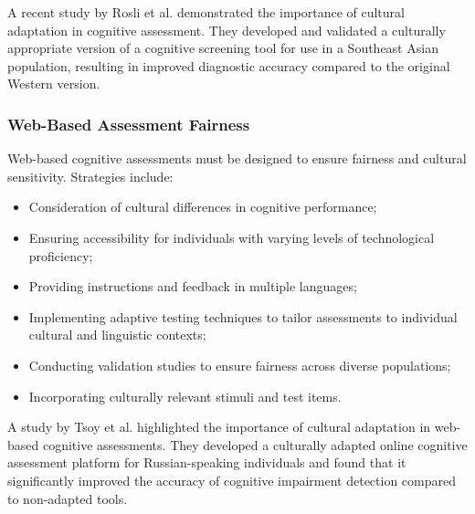 A recent study by Rosli et al. \cite{Rosli2021} demonstrated the importance of cultural adaptation in cognitive assessment. They developed and validated a culturally appropriate version of a cognitive screening tool for use in a Southeast Asian population, resulting in improved diagnostic accuracy compared to the original Western version.

\subsubsection{Web-Based Assessment Fairness}
Web-based cognitive assessments must be designed to ensure fairness and cultural sensitivity. Strategies include:
\begin{itemize}
    \item Consideration of cultural differences in cognitive performance;
    \item Ensuring accessibility for individuals with varying levels of technological proficiency;
    \item Providing instructions and feedback in multiple languages;
    \item Implementing adaptive testing techniques to tailor assessments to individual cultural and linguistic contexts;
    \item Conducting validation studies to ensure fairness across diverse populations;
    \item Incorporating culturally relevant stimuli and test items.
\end{itemize}

A study by Tsoy et al. \cite{Tsoy2019} highlighted the importance of cultural adaptation in web-based cognitive assessments. They developed a culturally adapted online cognitive assessment platform for Russian-speaking individuals and found that it significantly improved the accuracy of cognitive impairment detection compared to non-adapted tools.

